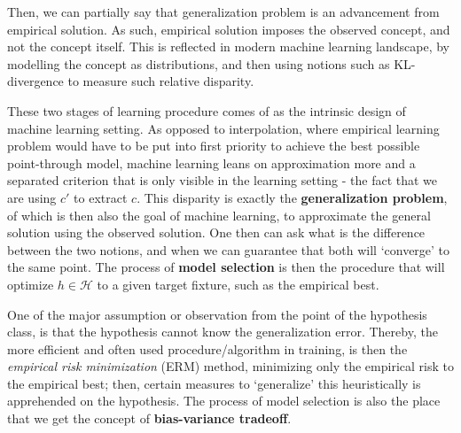\documentclass[10pt,oneside,oldfontcommands,dvipsnames,article]{memoir}
\begin{document}
Then, we can partially say that generalization problem is an advancement from empirical solution. As such, empirical solution imposes the observed concept, and not the concept itself. This is reflected in modern machine learning landscape, by modelling the concept as distributions, and then using notions such as KL-divergence to measure such relative disparity. 

These two stages of learning procedure comes of as the intrinsic design of machine learning setting. As opposed to interpolation, where empirical learning problem would have to be put into first priority to achieve the best possible point-through model, machine learning leans on approximation more and a separated criterion that is only visible in the learning setting - the fact that we are using $c'$ to extract $c$. This disparity is exactly the \textbf{generalization problem}, of which is then also the goal of machine learning, to approximate the general solution using the observed solution. One then can ask what is the difference between the two notions, and when we can guarantee that both will `converge' to the same point. The process of \textbf{model selection} is then the procedure that will optimize $h\in \mathcal{H}$ to a given target fixture, such as the empirical best. 

One of the major assumption or observation from the point of the hypothesis class, is that the hypothesis cannot know the generalization error. Thereby, the more efficient and often used procedure/algorithm in training, is then the \textit{empirical risk minimization} (ERM) method, minimizing only the empirical risk to the empirical best; then, certain measures to `generalize' this heuristically is apprehended on the hypothesis. The process of model selection is also the place that we get the concept of \textbf{bias-variance tradeoff}. 
\end{document}
